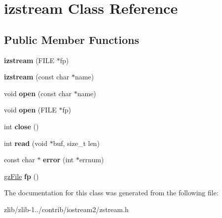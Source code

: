 \hypertarget{classizstream}{\section{izstream Class Reference}
\label{classizstream}
}
\subsection*{Public Member Functions}
\begin{DoxyCompactItemize}
\item 
\hypertarget{classizstream_a9f958c2eef83729ec6dda0b800e48273}{{\bfseries izstream} (F\+I\+L\+E $\ast$fp)}\label{classizstream_a9f958c2eef83729ec6dda0b800e48273}

\item 
\hypertarget{classizstream_a30fb60b38cda7232e23b199c00e72412}{{\bfseries izstream} (const char $\ast$name)}\label{classizstream_a30fb60b38cda7232e23b199c00e72412}

\item 
\hypertarget{classizstream_a3e0af69bbc4704daa637850817b77098}{void {\bfseries open} (const char $\ast$name)}\label{classizstream_a3e0af69bbc4704daa637850817b77098}

\item 
\hypertarget{classizstream_a1ddcaff781f58a08576f0935be5ccd3c}{void {\bfseries open} (F\+I\+L\+E $\ast$fp)}\label{classizstream_a1ddcaff781f58a08576f0935be5ccd3c}

\item 
\hypertarget{classizstream_ac2a7342deb79761277e846c8b24ef92a}{int {\bfseries close} ()}\label{classizstream_ac2a7342deb79761277e846c8b24ef92a}

\item 
\hypertarget{classizstream_a6e280a19c4a745ab4acc9615788ffa95}{int {\bfseries read} (void $\ast$buf, size\+\_\+t len)}\label{classizstream_a6e280a19c4a745ab4acc9615788ffa95}

\item 
\hypertarget{classizstream_a19ca9a17f897366d081aae3950f7946e}{const char $\ast$ {\bfseries error} (int $\ast$errnum)}\label{classizstream_a19ca9a17f897366d081aae3950f7946e}

\item 
\hypertarget{classizstream_a0438da66cc9cdb1a2a7ab4872a909fbf}{\hyperlink{structgz_file__s}{gz\+File} {\bfseries fp} ()}\label{classizstream_a0438da66cc9cdb1a2a7ab4872a909fbf}

\end{DoxyCompactItemize}


The documentation for this class was generated from the following file\+:\begin{DoxyCompactItemize}
\item 
zlib/zlib-\/1../contrib/iostream2/zstream.\+h\end{DoxyCompactItemize}
